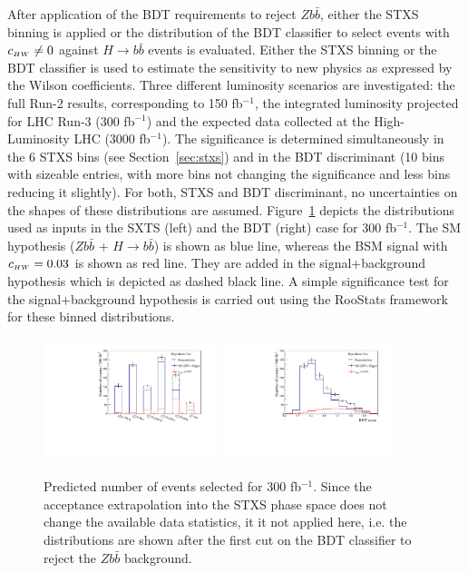 After application of the BDT requirements to reject $Z b\bar{b}$, either the STXS binning is applied or the distribution of the BDT classifier to select events with $c_{\scriptscriptstyle HW} \neq 0$ against $H\to b\bar{b}$ events is evaluated. Either the STXS binning or the BDT classifier is used to estimate the sensitivity to new physics as expressed by the Wilson coefficients. Three different luminosity scenarios are investigated: the full Run-2 results, corresponding to 150 fb$^{-1}$, the integrated luminosity projected for LHC Run-3 (300 fb$^{-1}$) and the expected data collected at the High-Luminosity LHC (3000 fb$^{-1}$). The significance is determined simultaneously in the 6 STXS bins (see Section~\ref{sec:stxs}) and in the BDT discriminant (10 bins with sizeable entries, with more bins not changing the significance and less bins reducing it slightly). For both, STXS and BDT discriminant, no uncertainties on the shapes of these distributions are assumed. Figure~\ref{fig:hypotest} depicts the distributions used as inputs in the SXTS (left) and the BDT (right) case for 300 fb$^{-1}$. The SM hypothesis ($Z b\bar{b}$ + $H\to b\bar{b}$) is shown as blue line, whereas the BSM signal with $c_{\scriptscriptstyle HW} = 0.03$ is shown as red line. They are added in the signal+background hypothesis which is depicted as dashed black line. A simple significance test for the signal+background hypothesis is carried out using the {\sc RooStats} framework~\cite{Moneta:2010pm} for these binned distributions. 
 
 
\begin{figure}[htb]
\centering
      \includegraphics[width=0.45\textwidth]{plots/HypoTest_STXS.pdf}
      \includegraphics[width=0.45\textwidth]{plots/HypoTest_BDT.pdf}
      \caption{Predicted number of events selected for 300 fb$^{-1}$. Since the acceptance extrapolation into the STXS phase space does not change the available data statistics, it it not applied here, i.e. the distributions are shown after the first cut on the BDT classifier to reject the $Z b\bar{b}$ background.}
\label{fig:hypotest}
\end{figure}

